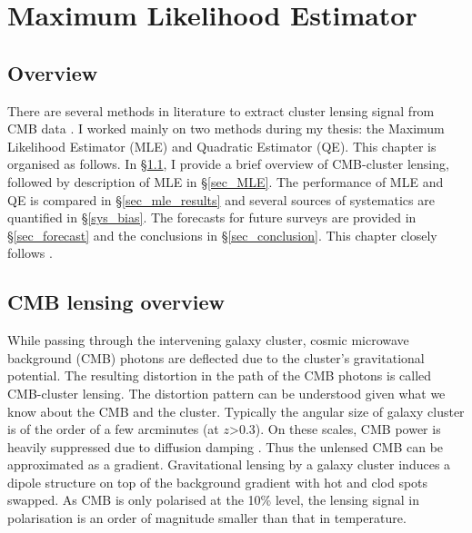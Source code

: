 \chapter{Maximum Likelihood Estimator}
\label{ch:MLE}
\section*{Overview}
There are several methods in literature to extract cluster lensing signal from CMB data \citep{dodelson04, lewis06, baxter15, hu07, melin15,yoo08,horowitz19, raghunathan17a,horowitz19}. 
 I worked mainly on two methods during my thesis: the Maximum Likelihood Estimator (MLE) and Quadratic Estimator (QE). 
This chapter is organised as follows. In \S\ref{cmb_overview}, I provide a brief overview of CMB-cluster lensing, followed by description of MLE in \S\ref{sec_MLE}. The performance of MLE and QE is compared in \S\ref{sec_mle_results} and several sources of systematics are quantified in \S\ref{sys_bias}. The forecasts for future surveys are provided in \S\ref{sec_forecast} and the conclusions in \S\ref{sec_conclusion}. This chapter closely follows \citet{raghunathan17a}.

\section{CMB lensing overview}
\label{cmb_overview}
While passing through the intervening galaxy cluster, cosmic microwave background (CMB) photons are deflected due to the cluster's gravitational potential. 
The resulting distortion in the path of the CMB photons is called CMB-cluster lensing. 
The distortion pattern can be understood given what we know about the CMB and the cluster.
Typically the angular size of galaxy cluster is of the order of a few arcminutes (at $z$>0.3). 
On these scales, CMB power is heavily suppressed due to diffusion damping \citep{silk68}.
Thus the unlensed CMB can be approximated as a gradient. 
Gravitational lensing by a galaxy cluster induces a dipole structure on top of the background gradient with hot and clod spots swapped. 
As CMB is only polarised at the 10\% level, the lensing signal in polarisation is an order of magnitude smaller than that in temperature. 


